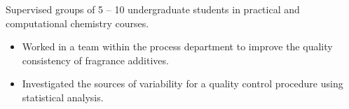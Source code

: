 {    
    
    Supervised groups of 5 – 10 undergraduate students in practical and computational chemistry courses.
    \spacevv

    \begin{itemize}
    \item Worked in a team within the process department to improve the quality consistency of fragrance additives.
    \item Investigated the sources of variability for a quality control procedure using statistical analysis.
    \end{itemize}
    
}
